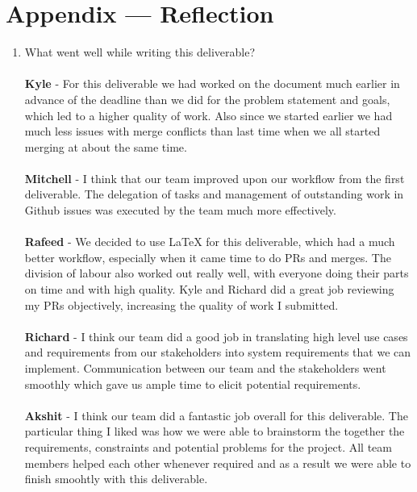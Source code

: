 \documentclass[12pt]{article}
\begin{document}
  \section*{Appendix --- Reflection}
  \begin{enumerate}
    \item What went well while writing this deliverable? \\
      \\
      \textbf{Kyle} - For this deliverable we had worked on the
      document much earlier in advance of the deadline than we did for
      the problem statement and goals, which led to a higher quality of
      work. Also since we started earlier we had much less issues with
      merge conflicts than last time when we all started merging at
      about the same time.\\
      \\
      \textbf{Mitchell} - I think that our team improved upon our
      workflow from the first deliverable. The delegation of tasks and
      management of outstanding work in Github issues was executed by
      the team much more effectively.\\
      \\
      \textbf{Rafeed} - We decided to use LaTeX for this deliverable,
      which had a much better workflow, especially when it came time to
      do PRs and merges. The division of labour also worked out really
      well, with everyone doing their parts on time and with high
      quality. Kyle and Richard did a great job reviewing my PRs
      objectively, increasing the quality of work I submitted. \\
      \\
      \textbf{Richard} - I think our team did a good job in
      translating high level
      use cases and requirements from our stakeholders into system requirements
      that we can implement. Communication between our team and the stakeholders
      went smoothly which gave us ample time to elicit potential requirements.\\
      \\
      \textbf{Akshit} - I think our team did a fantastic job overall
      for this deliverable.
      The particular thing I liked was how we were able to brainstorm
      the together the requirements,
      constraints and potential problems for the project. All team
      members helped each other whenever
      required and as a result we were able to finish smoohtly with
      this deliverable.\\


\end{enumerate}
\end{document}
